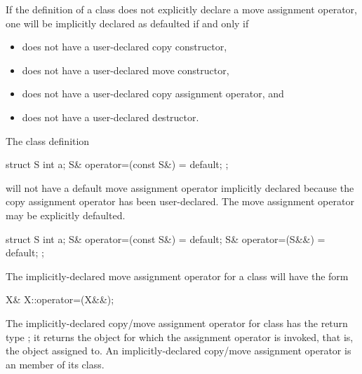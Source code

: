 \pnum
{}%
If the definition of a class  does not explicitly declare a
move assignment operator, one
will be implicitly declared as defaulted if and only if

\begin{itemize}
\item
{} does not have a user-declared copy constructor,

\item
{} does not have a user-declared move constructor,

\item
{} does not have a user-declared copy assignment operator, and

\item
{} does not have a user-declared destructor.
\end{itemize}

\enterexample The class definition
\begin{codeblock}
struct S {
  int a;
  S& operator=(const S&) = default;
};
\end{codeblock}

will not have a default move assignment operator implicitly declared because the
copy assignment operator has been user-declared. The move assignment operator may
be explicitly defaulted.

\begin{codeblock}
struct S {
  int a;
  S& operator=(const S&) = default;
  S& operator=(S&&) = default;
};
\end{codeblock}
\exitexample

\pnum
The implicitly-declared move assignment operator for a class  will have the form
\begin{codeblock}
X& X::operator=(X&&);
\end{codeblock}

\pnum
The implicitly-declared copy/move assignment operator for class
has the return type
;
it returns the object for which the assignment operator is invoked, that is,
the object assigned to.
An implicitly-declared copy/move assignment operator is an
member of its class.

